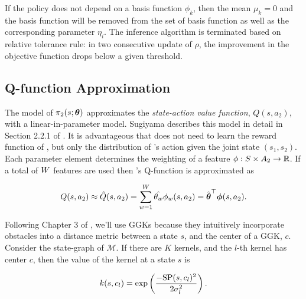     \begin{remark}
    If the policy does not depend on a basis function $\phi_k$, then the mean $\mu_k=0$ and the basis function will be
    removed from the set of basis function  as well as the corresponding parameter $\eta_i$. The inference algorithm is
    terminated based on relative tolerance rule:  in two consecutive update of $\rho$, the improvement in the  objective
    function drops below a given threshold.  \end{remark}



\subsection{Q-function Approximation}\label{sec:policy_parameterization}
    The model of $\pi_{2}(s; \boldsymbol{\mathbb{\theta}})$ approximates the \textit{state-action value function}, $Q(s,a_2)$, with a
    linear-in-parameter model. Sugiyama describes this model in detail in Section 2.2.1 of
    \cite{Sugiyama2015StatisticalRL}. It is advantageous that  does not need to learn the reward function of
    , but only the distribution of 's action given the joint state $(s_1, s_2)$. Each parameter
    element determines the weighting of a feature $\phi : S \times A_2 \rightarrow \mathbb{R}$. If a total of $W$
    features are used then 's Q-function is approximated as

    \begin{equation*}\label{eq:QFuncApprox}
        Q(s,a_2) \approx \hat{Q}(s,a_2) = \sum_{w=1}^{W} \hat{\theta_{w}} \phi_{w}(s,a_2)
            = \hat{\boldsymbol{\mathbb{\theta}}}^\top \boldsymbol{\mathbb{\phi}}(s, a_2).
    \end{equation*}

    Following Chapter 3 of \cite{Sugiyama2015StatisticalRL}, we'll use \acp{GGK} because they intuitively incorporate
    obstacles into a distance metric between a state $s$, and the center of a \ac{GGK}, $c$. Consider the state-graph of
    $\mathcal{M}$. If there are $K$ kernels, and the $l$-th kernel has center $c$, then the value of the kernel at a
    state $s$ is

    \begin{equation*}
        k(s,c_{l}) = \exp \left( \frac{-\text{SP}(s,c_{l})^2}
            {2\sigma^2_{l}} \right).
    \end{equation*}

